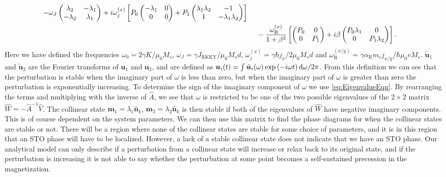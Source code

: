 \begin{subequations}
\begin{align}
    - \omega_J \begin{pmatrix}
     \lambda_2 & -\lambda_1 \\
     -\lambda_2 & \lambda_1
    \end{pmatrix}
    + i\omega_j^{(x)}\left[P_0
    \begin{pmatrix}
     -\lambda_1 & 0 \\
     0 & 0
    \end{pmatrix}
    + P_1
    \begin{pmatrix}
     \lambda_1\lambda_2 & -1 \\
     1 & -\lambda_1\lambda_2
    \end{pmatrix}\right] \\
    &\hspace{4.5mm} -\frac{\omega_{\text{R}}^{(x)}}{1+\beta^2}\left[
    \begin{pmatrix}
     P_0 & 0 \\
     0 & P_1
    \end{pmatrix}
    + i \beta
    \begin{pmatrix}
     P_0\lambda_1 & 0 \\
     0 & P_1\lambda_2
    \end{pmatrix}\right]. \label{eq:Vfilm}
\end{align}
\end{subequations}
Here we have defined the frequencies $\omega_0 = 2\gamma K/\mu_0M_s$, $\omega_J = \gamma J_{\text{RKKY}}/\mu_0 M_s d$, $\omega_j^{(x)} = \gamma \hbar j_x/2\mu_0M_sd$ and $\omega_{\text{R}}^{(x/y)} = \gamma \alpha_{\text{R}} m_e j_{x/y}/\hbar\mu_0 e M_s$. $\tilde{\mathbold{u}}_1$ and $\tilde{\mathbold{u}}_2$ are the Fourier transforms of $\mathbold{u}_1$ and $\mathbold{u}_2$, and are defined as $\mathbold{u}_i(t) = \int \tilde{\mathbold{u}}_i(\omega) \exp\left(-i\omega t\right) \d \omega/{2\pi}$. From this definition we can see that the perturbation is stable when the imaginary part of $\omega$ is less than zero, but when the imaginary part of $\omega$ is greater than zero the perturbation is exponentially increasing. To determine the sign of the imaginary component of $\omega$ we use \eqref{eq:EigenvalueEqn}. By rearranging the terms and multiplying with the inverse of $\hat{A}$, we see that $\omega$ is restricted to be one of the two possible eigenvalues of the $2\times2$ matrix $\hat{W} = -\hat{A}^{-1}\hat{V}$. The collinear state $\mathbold{m}_1=\lambda_1\mathbold{\hat{n}}_k$, $\mathbold{m}_2=\lambda_2\mathbold{\hat{n}}_k$ is then stable if both of the eigenvalues of $\hat{W}$ have negative imaginary components. This is of course dependent on the system parameters. We can then use this matrix to find the phase diagrams for when the collinear states are stable or not. There will be a region where none of the collinear states are stable for some choice of parameters, and it is in this region that an STO phase will have to be localized. However, a lack of a stable collinear state does not indicate that we have an STO phase. Our analytical model can only describe if a perturbation from a collinear state will increase or relax back to its original state, and if the perturbation is increasing it is not able to say whether the perturbation at some point becomes a self-sustained precession in the magnetization. 

